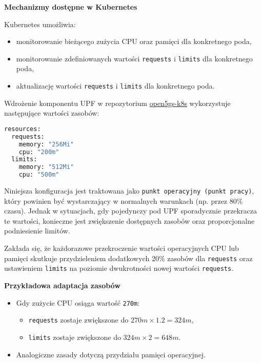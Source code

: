 \textbf{Mechanizmy dostępne w Kubernetes}

Kubernetes umożliwia:
\begin{itemize}
    \item monitorowanie bieżącego zużycia CPU oraz pamięci dla konkretnego poda,
    \item monitorowanie zdefiniowanych wartości \texttt{requests} i \texttt{limits} dla konkretnego poda,
    \item aktualizację wartości \texttt{requests} i \texttt{limits} dla konkretnego poda.
\end{itemize}

Wdrożenie komponentu UPF w repozytorium \href{https://github.com/niloysh/open5gs-k8s}{open5gs-k8s} wykorzystuje następujące wartości zasobów:

\begin{lstlisting}[language=sh, caption=Konfiguracja zasobów dla UPF w Open5GS]
resources:
  requests:
    memory: "256Mi"
    cpu: "200m"
  limits:
    memory: "512Mi"
    cpu: "500m"
\end{lstlisting}

Niniejsza konfiguracja jest traktowana jako \texttt{punkt operacyjny (punkt pracy)}, który powinien być wystarczający w normalnych warunkach (np. przez 80\% czasu). Jednak w sytuacjach, gdy pojedynczy pod UPF sporadycznie przekracza te wartości, konieczne jest zwiększenie dostępnych zasobów oraz proporcjonalne podniesienie limitów.

Zakłada się, że każdorazowe przekroczenie wartości operacyjnych CPU lub pamięci skutkuje przydzieleniem dodatkowych 20\% zasobów dla \texttt{requests} oraz ustawieniem \texttt{limits} na poziomie dwukrotności nowej wartości \texttt{requests}.

\textbf{Przykładowa adaptacja zasobów}

\begin{itemize}
    \item Gdy zużycie CPU osiąga wartość \texttt{270m}:
    \begin{itemize}
        \item \texttt{requests} zostaje zwiększone do \( 270m \times 1.2 = 324m \),
        \item \texttt{limits} zostaje zwiększone do \( 324m \times 2 = 648m \).
    \end{itemize}
    \item Analogiczne zasady dotyczą przydziału pamięci operacyjnej.
\end{itemize}

